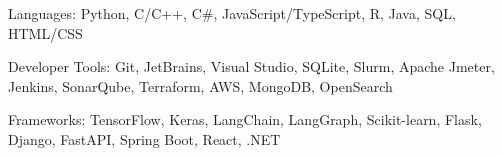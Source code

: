 
\begin{cvawards}
  \cvaward
    {Languages:} %
    {Python, C/C++, C\#, JavaScript/TypeScript, R, Java, SQL, HTML/CSS} %

  \cvaward
    {Developer Tools:} %
    {Git, JetBrains, Visual Studio, SQLite, Slurm, Apache Jmeter, Jenkins, SonarQube, Terraform, AWS, MongoDB, OpenSearch} %

  \cvaward
    {Frameworks:} %
    {TensorFlow, Keras, LangChain, LangGraph, Scikit-learn, Flask, Django, FastAPI, Spring Boot, React, .NET} %
\end{cvawards}
